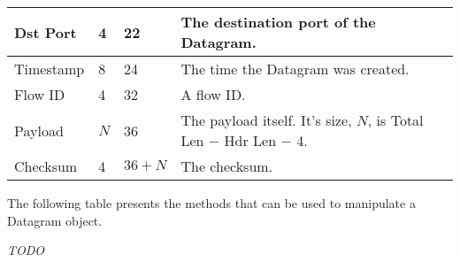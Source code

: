{\begin{longtable}{ | l | l | l | p{9.5cm} | }
Dst Port & 4 & 22 & The destination port of the Datagram. \\
\hline

Timestamp & 8 & 24 & The time the Datagram was created. \\
\hline

Flow ID & 4 & 32 & A flow ID. \\
\hline

Payload & $N$ &  36 & The payload itself.  \newline
It's size, $N$, is Total Len $-$ Hdr Len $-$ 4. \\
\hline

Checksum & 4 & $ 36 + N$ & The checksum. \\
\hline

\end{longtable}

\normalsize

}


\noindent The following table presents the methods that can be used to
manipulate a Datagram object.

\emph{TODO}
